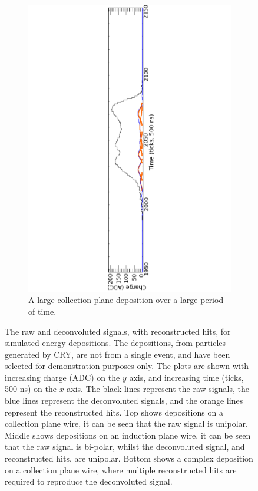 \begin{figure}
\begin{subfigure}{0.95\textwidth}
    \includegraphics[width=\textwidth]{Complex}
    \caption{A large collection plane deposition over a large period of time.}
    \label{fig:LotsOfHits_Big}
  \end{subfigure}
  \caption[A selectron of reconstructed hits, from simulated energy depositions]
          {The raw and deconvoluted signals, with reconstructed hits, for simulated energy depositions. The depositions, from particles generated by CRY, are not from a single event, and have been selected for demonstration purposes only. The plots are shown with increasing charge (ADC) on the $y$ axis, and increasing time (ticks, 500 ns) on the $x$ axis. The black lines represent the raw signals, the blue lines represent the deconvoluted signals, and the orange lines represent the reconstructed hits. Top shows depositions on a collection plane wire, it can be seen that the raw signal is unipolar. Middle shows depositions on an induction plane wire, it can be seen that the raw signal is bi-polar, whilst the deconvoluted signal, and reconstructed hits, are unipolar. Bottom shows a complex deposition on a collection plane wire, where multiple reconstructed hits are required to reproduce the deconvoluted signal.}
  \label{fig:LotsOfHits}
\end{figure}


